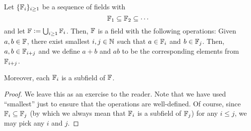 \begin{lem} \label{lem:sequence-of-fields}
    Let $\{\mathbb{F}_i\}_{i \geq 1}$ be a sequence of fields with
    \[
        \mathbb{F}_1 \subseteq \mathbb{F}_2 \subseteq \cdots
    \]
    and let $\mathbb{F} \vcentcolon= \bigcup_{i \geq 1} \mathbb{F}_i$. Then, $\mathbb{F}$ is a field with the following operations: Given $a,b \in \mathbb{F}$, there exist smallest $i,j \in \mathbb{N}$ such that $a \in \mathbb{F}_i$ and $b \in \mathbb{F}_j$. Then, $a,b \in \mathbb{F}_{i+j}$ and we define $a+b$ and $ab$ to be the corresponding elements from $\mathbb{F}_{i+j}$.
    
    Moreover, each $\mathbb{F}_i$ is a subfield of $\mathbb{F}$.
\end{lem}
\begin{proof}
    We leave this as an exercise to the reader. Note that we have used ``smallest'' just to ensure that the operations are well-defined. Of course, since $\mathbb{F}_i \subseteq \mathbb{F}_j$ (by which we always mean that $\mathbb{F}_i$ is a subfield of $\mathbb{F}_j$) for any $i \leq j$, we may pick any $i$ and $j$.
\end{proof}


